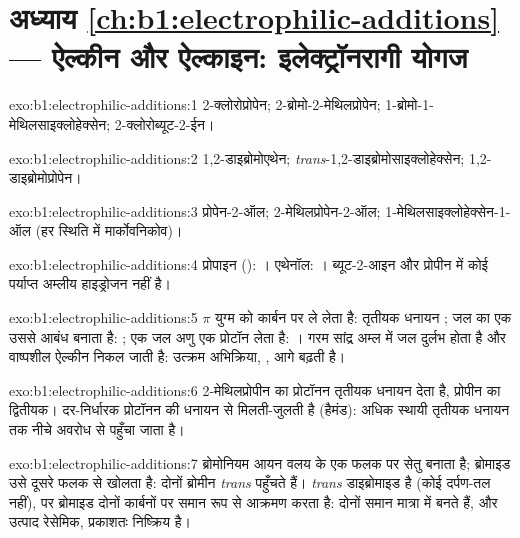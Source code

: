 \section*{अध्याय \ref{ch:b1:electrophilic-additions} --- ऐल्कीन और ऐल्काइन: इलेक्ट्रॉनरागी योगज}

\begin{solution}{exo:b1:electrophilic-additions:1}
2-क्लोरोप्रोपेन; 2-ब्रोमो-2-मेथिलप्रोपेन; 1-ब्रोमो-1-मेथिलसाइक्लोहेक्सेन;
2-क्लोरोब्यूट-2-ईन।
\end{solution}

\begin{solution}{exo:b1:electrophilic-additions:2}
1,2-डाइब्रोमोएथेन; \textit{trans}-1,2-डाइब्रोमोसाइक्लोहेक्सेन;
1,2-डाइब्रोमोप्रोपेन।
\end{solution}

\begin{solution}{exo:b1:electrophilic-additions:3}
प्रोपेन-2-ऑल; 2-मेथिलप्रोपेन-2-ऑल; 1-मेथिलसाइक्लोहेक्सेन-1-ऑल (हर स्थिति में
मार्कोवनिकोव)।
\end{solution}

\begin{solution}{exo:b1:electrophilic-additions:4}
प्रोपाइन (): । एथेनॉल:
। ब्यूट-2-आइन और प्रोपीन में कोई
पर्याप्त अम्लीय हाइड्रोजन नहीं है।
\end{solution}

\begin{solution}{exo:b1:electrophilic-additions:5}
$\pi$ युग्म  को  कार्बन पर ले लेता है: तृतीयक धनायन
; जल का एक  उससे आबंध बनाता है: ; एक जल
अणु एक प्रोटॉन लेता है: । गरम सांद्र अम्ल में जल
दुर्लभ होता है और वाष्पशील ऐल्कीन निकल जाती है: उत्क्रम अभिक्रिया, ,
आगे बढ़ती है।
\end{solution}

\begin{solution}{exo:b1:electrophilic-additions:6}
2-मेथिलप्रोपीन का प्रोटॉनन तृतीयक धनायन देता है, प्रोपीन का
द्वितीयक। दर-निर्धारक प्रोटॉनन की  धनायन से
मिलती-जुलती है (हैमंड): अधिक स्थायी तृतीयक धनायन तक
नीचे अवरोध से पहुँचा जाता है।
\end{solution}

\begin{solution}{exo:b1:electrophilic-additions:7}
ब्रोमोनियम आयन वलय के एक फलक पर सेतु बनाता है; ब्रोमाइड उसे
दूसरे फलक से खोलता है: दोनों ब्रोमीन \textit{trans} पहुँचते हैं। \textit{trans}
डाइब्रोमाइड  है (कोई दर्पण-तल नहीं), पर ब्रोमाइड दोनों कार्बनों पर समान रूप से आक्रमण
करता है: दोनों  समान मात्रा में बनते हैं, और उत्पाद
रेसेमिक, प्रकाशतः निष्क्रिय है।
\end{solution}

